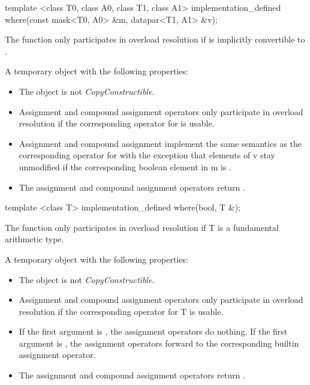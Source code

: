 \begin{itemdecl}
template <class T0, class A0, class T1, class A1>
implementation_defined where(const mask<T0, A0> &m, datapar<T1, A1> &v);
\end{itemdecl}
\begin{itemdescr}
  \pnum\remarks The function only participates in overload resolution if \mask[<T0, A0>] is implicitly convertible to \mask[<T1, A1>].

  \pnum\returns A temporary object with the following properties:
  \begin{itemize}
    \item The object is not \textit{CopyConstructible}.
    \item Assignment and compound assignment operators only participate in overload resolution if the corresponding operator for \datapar[<T1, A1>] is usable.
    \item \effects Assignment and compound assignment implement the same semantics as the corresponding operator for \datapar[<T1, A1>] with the exception that elements of \code v stay unmodified if the corresponding boolean element in \code m is \false.
    \item The assignment and compound assignment operators return \void.
  \end{itemize}
\end{itemdescr}

\begin{itemdecl}
template <class T> implementation_defined where(bool, T &);
\end{itemdecl}
\begin{itemdescr}
  \pnum\remarks The function only participates in overload resolution if \type T is a fundamental arithmetic type.

  \pnum\returns A temporary object with the following properties:
  \begin{itemize}
    \item The object is not \textit{CopyConstructible}.
    \item Assignment and compound assignment operators only participate in overload resolution if the corresponding operator for \type T is usable.
    \item \effects If the first argument is \false, the assignment operators do nothing.
      If the first argument is \true, the assignment operators forward to the corresponding builtin assignment operator.
    \item The assignment and compound assignment operators return \void.
  \end{itemize}
\end{itemdescr}
